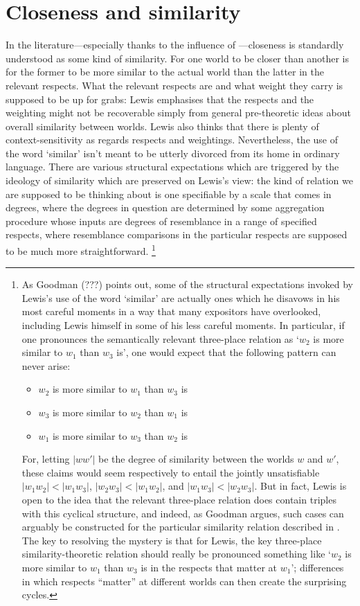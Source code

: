 \documentclass[If.tex]{subfiles}
\begin{document}
\section{Closeness and similarity} \label{objections-to-cem} 
In the literature---especially thanks to the influence of \citet{LewisCounterfactuals}---closeness is standardly understood as some kind of similarity. For one world to be closer than another is for the former to be more similar to the actual world than the latter in the relevant respects. What the relevant respects are and what weight they carry is supposed to be up for grabs: Lewis emphasises that the respects and the weighting might not be recoverable simply from general pre-theoretic ideas about overall similarity between worlds. Lewis also thinks that there is plenty of context-sensitivity as regards respects and weightings. Nevertheless, the use of the word ‘similar’ isn't meant to be utterly divorced from its home in ordinary language. There are various structural expectations which are triggered by the ideology of similarity which are preserved on Lewis's view: the kind of relation we are supposed to be thinking about is one specifiable by a scale that comes in degrees, where the degrees in question are determined by some aggregation procedure whose inputs are degrees of resemblance in a range of specified respects, where resemblance comparisons in the particular respects are supposed to be much more straightforward.%
\footnote{As Goodman (???) points out, some of the structural expectations invoked by Lewis's use of the word ‘similar’ are actually ones which he disavows in his most careful moments in a way that many expositors have overlooked, including Lewis himself in some of his less careful moments. In particular, if one pronounces the semantically relevant three-place relation as ‘$w_2$ is more similar to $w_1$ than $w_3$ is’, one would expect that the following pattern can never arise:
	\begin{itemize}
		\item
		$w_2$ is more similar to $w_1$ than
		$w_3$ is
		\item
		$w_3$ is more similar to $w_2$ than
		$w_1$ is
		\item
		$w_1$ is more similar to $w_3$ than
		$w_2$ is
	\end{itemize}
	For, letting $|ww'|$ be the degree of similarity between the worlds $w$ and $w'$, these claims would seem respectively to entail the jointly unsatisfiable $|w_1w_2|<|w_1w_3|$, $|w_2w_3|<|w_1w_2|$, and $|w_1w_3|<|w_2w_3|$. But in fact, Lewis is open to the idea that the relevant three-place relation does contain triples with this cyclical structure, and indeed, as Goodman argues, such cases can arguably be constructed for the particular similarity relation described in \cite{LewisCDTA}. The key to resolving the mystery is that for Lewis, the key three-place similarity-theoretic relation should really be pronounced something like ‘$w_2$ is more similar to $w_1$ than $w_3$ is in the respects that matter at $w_1$’; differences in which respects “matter” at different worlds can then create the surprising cycles.}
\end{document}
